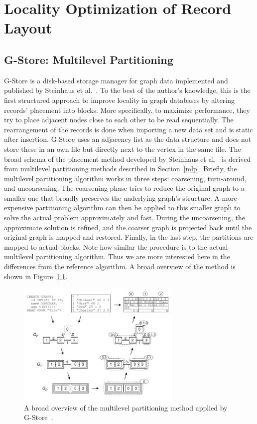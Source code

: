 \chapter{Locality Optimization of Record Layout}\label{methods}
\section{G-Store: Multilevel Partitioning}
    G-Store is a disk-based storage manager for graph data implemented and published by Steinhaus et al.~\autocite{steinhaus2010g}. 
    To the best of the author's knowledge, this is the first structured approach to improve locality in graph databases by altering records' placement into blocks.
    More specifically, to maximize performance, they try to place adjacent nodes close to each other to be read sequentially. 
    The rearrangement of the records is done when importing a new data set and is static after insertion.
    G-Store uses an adjacency list as the data structure and does not store these in an own file but directly next to the vertex in the same file.
    The broad schema of the placement method developed by Steinhaus et al.~\autocite{steinhaus2010g} is derived from multilevel partitioning methods described in Section~\ref{mlp}.
    Briefly, the multilevel partitioning algorithm works in three steps: coarsening, turn-around, and uncoarsening. 
    The coarsening phase tries to reduce the original graph to a smaller one that broadly preserves the underlying graph's structure. 
    A more expensive partitioning algorithm can then be applied to this smaller graph to solve the actual problem approximately and fast.
    During the uncoarsening, the approximate solution is refined, and the coarser graph is projected back until the original graph is mapped and restored.
    Finally, in the last step, the partitions are mapped to actual blocks.
    Note how similar the procedure is to the actual multilevel partitioning algorithm. 
    Thus we are more interested here in the differences from the reference algorithm.
    A broad overview of the method is shown in Figure~\ref{g-store}.
    
    \begin{figure}[htp]
        \begin{center}
            \includegraphics[keepaspectratio,width=0.7\textwidth]{img/06-rel_w/g-store.png}
        \end{center}
        \caption{A broad overview of the multilevel partitioning method applied by G-Store~\autocite{steinhaus2010g}.} 
        \label{g-store}
    \end{figure}

